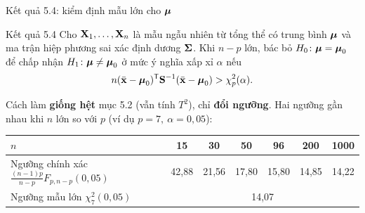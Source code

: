 \begin{frame}{Kết quả 5.4: kiểm định mẫu lớn cho \texorpdfstring{\(\boldsymbol{\mu}\)}{mu}}
  \begin{block}{Kết quả 5.4}
    Cho \(\mathbf{X}_1,\dots,\mathbf{X}_n\) là mẫu ngẫu nhiên từ tổng thể có trung bình \(\boldsymbol{\mu}\)
    và ma trận hiệp phương sai xác định dương \(\boldsymbol{\Sigma}\). Khi \(n-p\) lớn, bác bỏ
    \(H_0\colon\boldsymbol{\mu}=\boldsymbol{\mu}_0\) để chấp nhận \(H_1\colon\boldsymbol{\mu}\neq\boldsymbol{\mu}_0\)
    ở mức ý nghĩa xấp xỉ \(\alpha\) nếu
    \[
      n(\bar{\mathbf{x}}-\boldsymbol{\mu}_0)^{\mathsf T}\mathbf{S}^{-1}(\bar{\mathbf{x}}-\boldsymbol{\mu}_0) > \chi^2_p(\alpha).
    \]
  \end{block}
  \vspace{0.1cm}
  Cách làm \textbf{giống hệt} mục 5.2 (vẫn tính \(T^2\)), chỉ \textbf{đổi ngưỡng}.
  Hai ngưỡng gần nhau khi \(n\) lớn so với \(p\) (ví dụ \(p=7,\ \alpha=0{,}05\)):
  \begin{center}
    \small
    \begin{tabular}{@{}lcccccc@{}}
      \toprule
      \(n\) & 15 & 30 & 50 & 96 & 200 & 1000 \\
      \midrule
      Ngưỡng chính xác \(\frac{(n-1)p}{n-p}F_{p,n-p}(0{,}05)\) & 42{,}88 & 21{,}56 & 17{,}80 & 15{,}80 & 14{,}85 & 14{,}22 \\
      Ngưỡng mẫu lớn \(\chi^2_7(0{,}05)\) & \multicolumn{6}{c}{14{,}07} \\
      \bottomrule
    \end{tabular}
  \end{center}
\end{frame}

